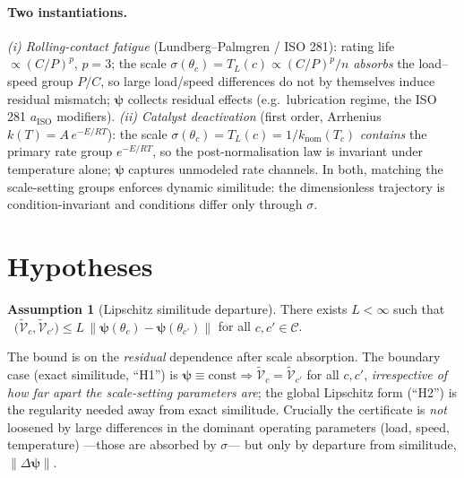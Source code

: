 \documentclass[11pt]{article}
\theoremstyle{definition}
\newtheorem{assumption}{Assumption}
\theoremstyle{remark}
\DeclareMathOperator{\dtv}{d_{\mathrm{TV}}}
\newcommand{\lawt}[1]{\tilde{\mathcal{V}}_{#1}}
\begin{document}
\paragraph{Two instantiations.}
\emph{(i) Rolling-contact fatigue} (Lundberg--Palmgren / ISO 281): rating life
$\propto (C/P)^p$, $p=3$; the scale $\sigma(\theta_c)=T_L(c)\propto (C/P)^p/n$
\emph{absorbs} the load--speed group $P/C$, so large load/speed differences do not by
themselves induce residual mismatch; $\boldsymbol\psi$ collects residual effects (e.g.\
lubrication regime, the ISO 281 $a_{\mathrm{ISO}}$ modifiers). \emph{(ii) Catalyst
deactivation} (first order, Arrhenius $k(T)=A\,e^{-E/RT}$): the scale
$\sigma(\theta_c)=T_L(c)=1/k_{\mathrm{nom}}(T_c)$ \emph{contains} the primary rate group
$e^{-E/RT}$, so the post-normalisation law is invariant under temperature alone;
$\boldsymbol\psi$ captures unmodeled rate channels. In both, matching the scale-setting
groups enforces dynamic similitude: the dimensionless trajectory is condition-invariant
and conditions differ only through $\sigma$.

\section{Hypotheses}
\begin{assumption}[Lipschitz similitude departure]\label{ass:lip}
There exists $L<\infty$ such that
$\dtv\!\big(\lawt c,\lawt{c'}\big)\le L\,\lVert\boldsymbol\psi(\theta_c)-\boldsymbol\psi(\theta_{c'})\rVert$
for all $c,c'\in\mathcal C$.
\end{assumption}
\noindent The bound is on the \emph{residual} dependence after scale absorption. The
boundary case (exact similitude, ``H1'') is $\boldsymbol\psi\equiv\text{const}
\Rightarrow\lawt c=\lawt{c'}$ for all $c,c'$, \emph{irrespective of how far apart the
scale-setting parameters are}; the global Lipschitz form (``H2'') is the regularity
needed away from exact similitude. Crucially the certificate is \emph{not} loosened by
large differences in the dominant operating parameters (load, speed, temperature)
---those are absorbed by $\sigma$--- but only by departure from similitude,
$\lVert\Delta\boldsymbol\psi\rVert$.
\end{document}
